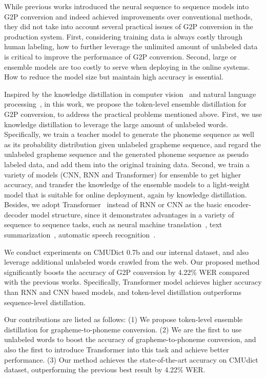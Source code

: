 \documentclass[a4paper]{article}
\begin{document}
While previous works introduced the neural sequence to sequence models into G2P conversion and indeed achieved improvements over conventional methods, they did not take into account several practical issues of G2P conversion in the production system. First, considering training data is always costly through human labeling, how to further leverage the unlimited amount of unlabeled data is critical to improve the performance of G2P conversion. Second, large or ensemble models are too costly to serve when deploying in the online systems. How to reduce the model size but maintain high accuracy is essential.

Inspired by the knowledge distillation in computer vision~\cite{hinton2015distilling,furlanello2018born} and natural language processing~\cite{kim2016sequence,freitag2017ensemble,tan2018multilingual}, in this work, we propose the token-level ensemble distillation for G2P conversion, to address the practical problems mentioned above. First, we use knowledge distillation to leverage the large amount of unlabeled words. Specifically, we train a teacher model to generate the phoneme sequence as well as its probability distribution given unlabeled grapheme sequence, and regard the unlabeled grapheme sequence and the generated phoneme sequence as pseudo labeled data, and add them into the original training data. Second, we train a variety of models (CNN, RNN and Transformer) for ensemble to get higher accuracy, and transfer the knowledge of the ensemble models to a light-weight model that is suitable for online deployment, again by knowledge distillation. Besides, we adopt Transformer~\cite{vaswani2017attention} instead of RNN or CNN as the basic encoder-decoder model structure, since it demonstrates advantages in a variety of sequence to sequence tasks, such as neural machine translation~\cite{vaswani2017attention}, text summarization~\cite{gong2018sentence}, automatic speech recognition~\cite{zhou2018comparison}. 

We conduct experiments on CMUDict 0.7b and our internal dataset, and also leverage additional unlabeled words crawled from the web. Our proposed method significantly boosts the accuracy of G2P conversion by 4.22\% WER compared with the previous works. Specifically, Transformer model achieves higher accuracy than RNN and CNN based models, and token-level distillation outperforms sequence-level distillation. 

Our contributions are listed as follows: (1) We propose token-level ensemble distillation for grapheme-to-phoneme conversion. (2) We are the first to use unlabeled words to boost the accuracy of grapheme-to-phoneme conversion, and  also the first to introduce Transformer into this task and achieve better performance. (3) Our method achieves the state-of-the-art accuracy on CMUdict dataset, outperforming the previous best result by 4.22\% WER.
\end{document}
